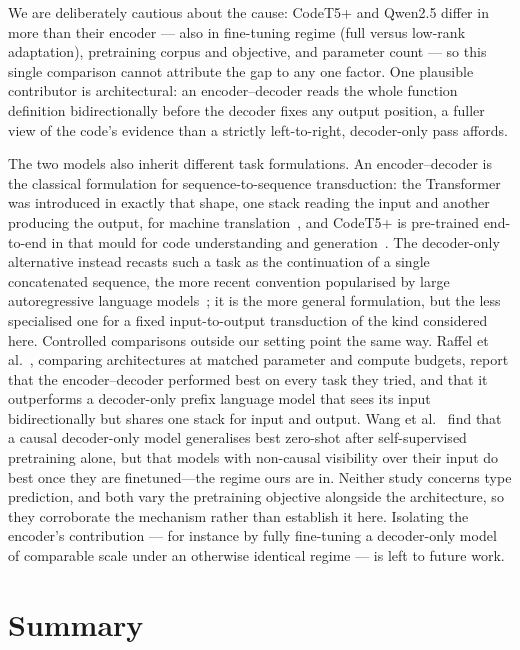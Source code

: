 We are deliberately cautious about the cause: CodeT5+ and Qwen2.5 differ in more than their encoder --- also in fine-tuning regime (full versus low-rank adaptation), pretraining corpus and objective, and parameter count --- so this single comparison cannot attribute the gap to any one factor.
One plausible contributor is architectural: an encoder--decoder reads the whole function definition bidirectionally before the decoder fixes any output position, a fuller view of the code's evidence than a strictly left-to-right, decoder-only pass affords.

The two models also inherit different task formulations.
An encoder--decoder is the classical formulation for sequence-to-sequence transduction: the Transformer was introduced in exactly that shape, one stack reading the input and another producing the output, for machine translation~\cite{vaswani2017}, and CodeT5+ is pre-trained end-to-end in that mould for code understanding and generation~\cite{codet5p}.
The decoder-only alternative instead recasts such a task as the continuation of a single concatenated sequence, the more recent convention popularised by large autoregressive language models~\cite{gpt3}; it is the more general formulation, but the less specialised one for a fixed input-to-output transduction of the kind considered here.
Controlled comparisons outside our setting point the same way.
Raffel et al.~\cite{t5}, comparing architectures at matched parameter and compute budgets, report that the encoder--decoder performed best on every task they tried, and that it outperforms a decoder-only prefix language model that sees its input bidirectionally but shares one stack for input and output.
Wang et al.~\cite{wang2022architecture} find that a causal decoder-only model generalises best zero-shot after self-supervised pretraining alone, but that models with non-causal visibility over their input do best once they are finetuned---the regime ours are in.
Neither study concerns type prediction, and both vary the pretraining objective alongside the architecture, so they corroborate the mechanism rather than establish it here.
Isolating the encoder's contribution --- for instance by fully fine-tuning a decoder-only model of comparable scale under an otherwise identical regime --- is left to future work.

\section{Summary}
\label{sec:llm-summary}

